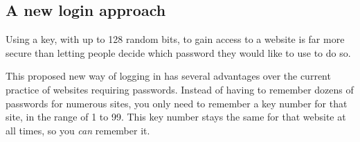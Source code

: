 \subsection{A new login approach}
Using a key,
with up to 128 random bits,
to gain access to a website is far more secure than letting people decide which password they would like to use to do so.
\par
This proposed new way of logging in has several advantages over the current practice of websites requiring passwords.
Instead of having to remember dozens of passwords for numerous sites,
you only need to remember a key number for that site, in the range of 1 to 99.
This key number stays the same for that website at all times, so you \emph{can} remember it.
